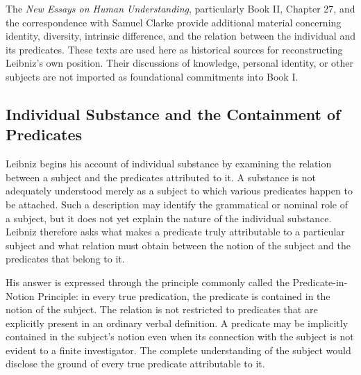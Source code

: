 The \textit{New Essays on Human Understanding}, particularly
Book II, Chapter 27, and the correspondence with Samuel
Clarke provide additional material concerning identity,
diversity, intrinsic difference, and the relation between
the individual and its predicates. These texts are used
here as historical sources for reconstructing Leibniz's
own position. Their discussions of knowledge, personal
identity, or other subjects are not imported as
foundational commitments into Book I. \cite[II.xxvii]{LeibnizNewEssays}
\cite{LeibnizClarkeCorrespondence}



\subsection{Individual Substance and the Containment of Predicates}
\label{subsec:ch08-leibniz-individual-substance}

\label{para:VS.B01.P01.C08.S07.SS03.P001}

Leibniz begins his account of individual substance by
examining the relation between a subject and the
predicates attributed to it. A substance is not
adequately understood merely as a subject to which
various predicates happen to be attached. Such a
description may identify the grammatical or nominal
role of a subject, but it does not yet explain the
nature of the individual substance. Leibniz therefore
asks what makes a predicate truly attributable to
a particular subject and what relation must obtain
between the notion of the subject and the predicates
that belong to it. \cite[§8]{LeibnizDiscourse}

\label{para:VS.B01.P01.C08.S07.SS03.P002}

His answer is expressed through the principle commonly
called the Predicate-in-Notion Principle: in every
true predication, the predicate is contained in the
notion of the subject. The relation is not restricted
to predicates that are explicitly present in an
ordinary verbal definition. A predicate may be
implicitly contained in the subject's notion even
when its connection with the subject is not evident
to a finite investigator. The complete understanding
of the subject would disclose the ground of every
true predicate attributable to it. \cite[§8]{LeibnizDiscourse}
\cite{LookLeibnizSEP2020}

